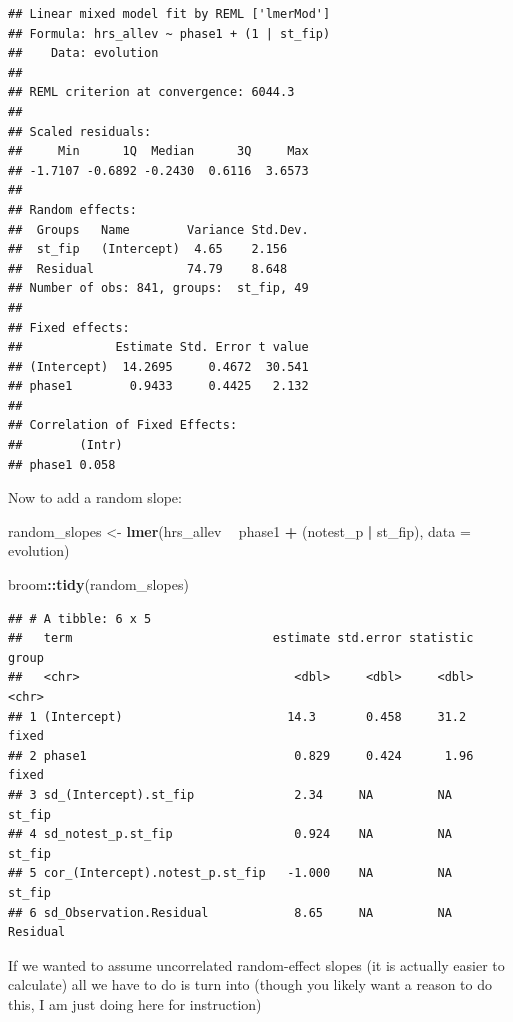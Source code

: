 \documentclass[]{book}
\newenvironment{Shaded}{\begin{snugshade}}{\end{snugshade}}
\newcommand{\KeywordTok}[1]{\textcolor[rgb]{0.13,0.29,0.53}{\textbf{#1}}}
\newcommand{\DataTypeTok}[1]{\textcolor[rgb]{0.13,0.29,0.53}{#1}}
\newcommand{\StringTok}[1]{\textcolor[rgb]{0.31,0.60,0.02}{#1}}
\newcommand{\OperatorTok}[1]{\textcolor[rgb]{0.81,0.36,0.00}{\textbf{#1}}}
\newcommand{\NormalTok}[1]{#1}
\begin{document}
\begin{verbatim}
## Linear mixed model fit by REML ['lmerMod']
## Formula: hrs_allev ~ phase1 + (1 | st_fip)
##    Data: evolution
## 
## REML criterion at convergence: 6044.3
## 
## Scaled residuals: 
##     Min      1Q  Median      3Q     Max 
## -1.7107 -0.6892 -0.2430  0.6116  3.6573 
## 
## Random effects:
##  Groups   Name        Variance Std.Dev.
##  st_fip   (Intercept)  4.65    2.156   
##  Residual             74.79    8.648   
## Number of obs: 841, groups:  st_fip, 49
## 
## Fixed effects:
##             Estimate Std. Error t value
## (Intercept)  14.2695     0.4672  30.541
## phase1        0.9433     0.4425   2.132
## 
## Correlation of Fixed Effects:
##        (Intr)
## phase1 0.058
\end{verbatim}

Now to add a random slope:

\begin{Shaded}
\begin{Highlighting}[]
\NormalTok{random_slopes <-}\StringTok{ }\KeywordTok{lmer}\NormalTok{(hrs_allev }\OperatorTok{~}\StringTok{ }\NormalTok{phase1 }\OperatorTok{+}\StringTok{ }\NormalTok{(notest_p }\OperatorTok{|}\StringTok{ }\NormalTok{st_fip), }\DataTypeTok{data =}\NormalTok{ evolution)}

\NormalTok{broom}\OperatorTok{::}\KeywordTok{tidy}\NormalTok{(random_slopes)}
\end{Highlighting}
\end{Shaded}

\begin{verbatim}
## # A tibble: 6 x 5
##   term                            estimate std.error statistic group   
##   <chr>                              <dbl>     <dbl>     <dbl> <chr>   
## 1 (Intercept)                       14.3       0.458     31.2  fixed   
## 2 phase1                             0.829     0.424      1.96 fixed   
## 3 sd_(Intercept).st_fip              2.34     NA         NA    st_fip  
## 4 sd_notest_p.st_fip                 0.924    NA         NA    st_fip  
## 5 cor_(Intercept).notest_p.st_fip   -1.000    NA         NA    st_fip  
## 6 sd_Observation.Residual            8.65     NA         NA    Residual
\end{verbatim}

If we wanted to assume uncorrelated random-effect slopes (it is actually
easier to calculate) all we have to do is turn \texttt{\textbar{}} into
\texttt{\textbar{}\textbar{}} (though you likely want a reason to do
this, I am just doing here for instruction)
\end{document}
